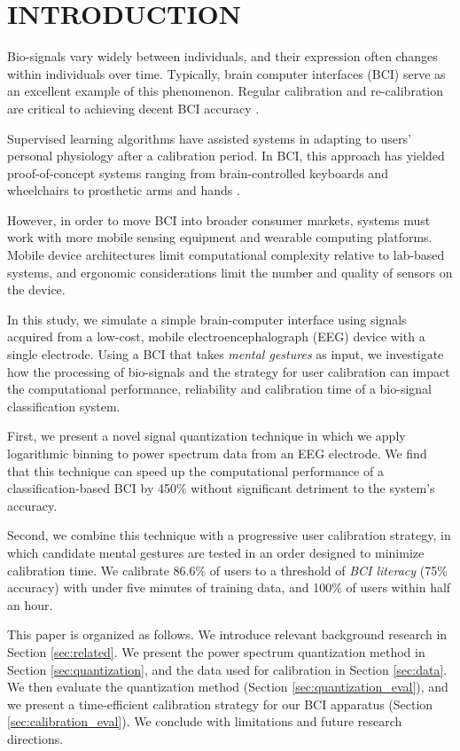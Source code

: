 \section{\uppercase{Introduction}}
\label{sec:introduction}

\noindent Bio-signals vary widely between individuals, and their expression often changes within individuals over time. Typically, brain computer interfaces (BCI) serve as an excellent example of this phenomenon. Regular calibration and re-calibration are critical to achieving decent BCI accuracy \cite{dornhege_toward_2007,mcfarland_brain-computer_2011}.

Supervised learning algorithms have assisted systems in adapting to users' personal physiology after a calibration period. In BCI, this approach has yielded proof-of-concept systems ranging from brain-controlled keyboards and wheelchairs to prosthetic arms and hands \cite{blankertz_note_2007,millan_combining_2010,d._mattia_brain_2011,hill_practical_2014,campbell_neurophone:_2010}. 

However, in order to move BCI into broader consumer markets, systems must work with more mobile sensing equipment and wearable computing platforms. Mobile device architectures limit computational complexity relative to lab-based systems, and ergonomic considerations limit the number and quality of sensors on the device. 

In this study, we simulate a simple brain-computer interface using signals acquired from a low-cost, mobile electroencephalograph (EEG) device with a single electrode. Using a BCI that takes \textit{mental gestures} as input, we investigate how the processing of bio-signals and the strategy for user calibration can impact the computational performance, reliability and calibration time of a bio-signal classification system. 

First, we present a novel signal quantization technique in which we apply logarithmic binning to power spectrum data from an EEG electrode. We find that this technique can speed up the computational performance of a classification-based BCI by 450\% without significant detriment to the system's accuracy. 

Second, we combine this technique with a progressive user calibration strategy, in which candidate mental gestures are tested in an order designed to minimize calibration time. We calibrate 86.6\% of users to a threshold of \textit{BCI literacy} (75\% accuracy) \cite{vidaurre_towards_2010} with under five minutes of training data, and 100\% of users within half an hour. 

This paper is organized as follows. We introduce relevant background research in Section \ref{sec:related}. We present the power spectrum quantization method in Section \ref{sec:quantization}, and the data used for calibration in Section \ref{sec:data}. We then evaluate the quantization method (Section \ref{sec:quantization_eval}), and we present a time-efficient calibration strategy for our BCI apparatus (Section \ref{sec:calibration_eval}). We conclude with limitations and future research directions.
